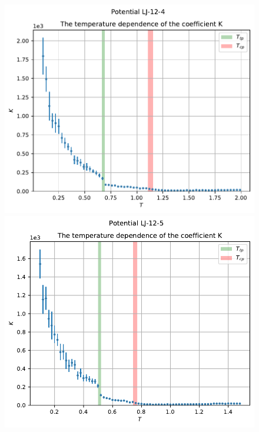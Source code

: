 \documentclass[pdf,hyperref={unicode}]{beamer}
\begin{document}
\begin{frame}
\begin{columns}
\begin{column}{0.6\linewidth}
\begin{figure}[h]
\begin{center}
\begin{minipage}[h]{0.45\linewidth}
\includegraphics[width=\textwidth, keepaspectratio]{plot_K_Potential LJ-12-4_1}
\end{minipage}
\begin{minipage}[h]{0.45\linewidth}
\includegraphics[width=\textwidth, keepaspectratio]{plot_K_Potential LJ-12-5_1}
\end{minipage}


\end{center}
\end{figure}
\end{column}
\end{columns}
\end{frame}
\end{document}
